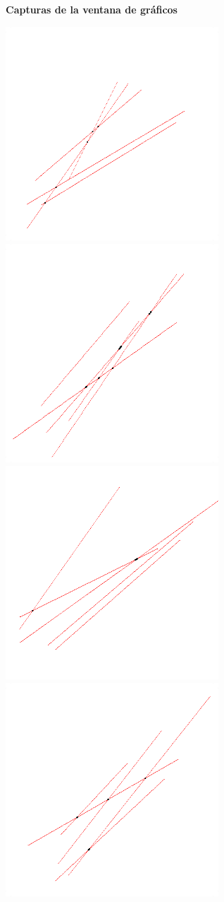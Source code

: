 \documentclass[a4paper]{article}
\begin{document}
\newpage
\Large{\textbf{Capturas de la ventana de gráficos}}\\[0.5cm]
\begin{center}
\includegraphics[width=8cm]{src/1.png}
\includegraphics[width=8cm]{src/2.png}\\
\includegraphics[width=8cm]{src/3.png}
\includegraphics[width=8cm]{src/4.png}
\end{center}
\end{document}
